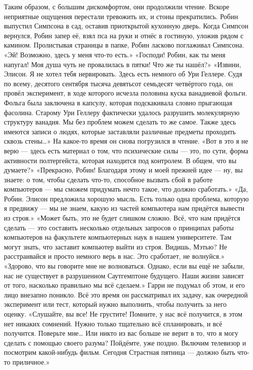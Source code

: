 \documentclass[a4paper,12pt]{book}
\begin{document}
	Таким образом, с большим дискомфортом, они продолжили чтение. Вскоре неприятные ощущения перестали тревожить их, и стоны прекратились. Робин выпустил Симпсона в сад, оставив приоткрытой кухонную дверь. Когда Симпсон вернулся, Робин запер её, взял пса на руки и отнёс в гостиную, уложив рядом с камином. Пролистывая страницы в папке, Робин ласково поглаживал Симпсона.
	«Эй! Возможно, здесь у меня что-то есть.»
	«Господи! Робин, как ты меня напугал! Моя душа чуть не провалилась в пятки! Что же ты нашёл?»
	«Извини, Элисон. Я не хотел тебя нервировать. Здесь есть немного об Ури Геллере. Судя по всему, десятого сентября тысяча девятьсот семьдесят четвёртого года, он провёл эксперимент, в ходе которого исчезла половина куска ванадиевой фольги. Фольга была заключена в капсулу, которая подскакивала словно прыгающая фасолина. Старому Ури Геллеру фактически удалось разрушить молекулярную структуру ванадия. Мы без проблем можем сделать то же самое. Также здесь имеются записи о людях, которые заставляли различные предметы проходить сквозь стены…»
	На какое-то время он снова погрузился в чтение.
	«Вот в это я не верю — здесь есть материал о том, что психические силы — это, по сути, форма активности полтергейста, которая находится под контролем. В общем, что вы думаете?»
	«Прекрасно, Робин! Благодаря этому и моей прежней идее — ну, вы знаете: о том, чтобы сделать что-то, способное вызвать сбой в работе компьютеров — мы сможем придумать нечто такое, что должно сработать.»
	«Да, Робин. Элисон предложила хорошую мысль. Есть только одна проблема, которую я предвижу — мы не знаем, какую из частей компьютера нам придётся вывести из строя.»
	«Может быть, это не будет слишком сложно. Всё, что нам придётся сделать — это составить несколько отдельных запросов о принципах работы компьютеров на факультете компьютерных наук в нашем университете. Там могут знать, что заставит компьютер выйти из строя. Видишь, Мэтью? Не расстраивайся и просто немного верь в нас. Это сработает, не волнуйся.»
	«Здорово, что вы говорите мне не волноваться. Однако, если вы ещё не забыли, нас не существует в разрушенном Саутгемптоне будущего. Наши жизни зависят от того, насколько правильно мы всё сделаем.»
	Гарри не подумал об этом, и его лицо внезапно поникло. Всё это время он рассматривал их задачу, как очередной эксперимент или тест, который нужно выполнить, чтобы получить за него оценку.
	«Слушайте, вы все! Не грустите! Помните, у нас всё получится, в этом нет никаких сомнений. Нужно только тщательно всё спланировать, и всё получится. Поверьте мне… Или никто из вас больше не верит в то, что я могу сделать с помощью своего разума? Пойдёмте, уже поздно. Включим телевизор и посмотрим какой-нибудь фильм. Сегодня Страстная пятница — должно быть что-то приличное.»
\end{document}
